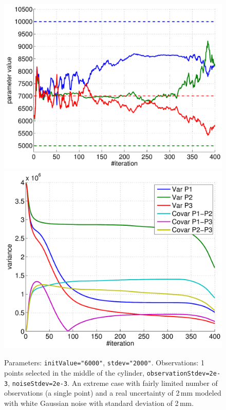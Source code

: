 \documentclass[10pt]{article}
\begin{document}
\begin{figure}[h]
\begin{center}
\includegraphics[width=.49\linewidth]{figures/p6_estim.pdf}
\hfill
\includegraphics[width=.49\linewidth]{figures/p6_var.pdf}
\caption{Parameters: \texttt{initValue="6000"}, \texttt{stdev="2000"}. Observations: 1 points selected in the middle of the cylinder,
\texttt{observationStdev=2e-3}, \texttt{noiseStdev=2e-3}. An extreme case with fairly limited number of observations (a single point) and a real uncertainty of 2\,mm modeled with white Gaussian noise with standard deviation of 2\,mm.}
\label{fig:Results1}
\end{center}
\end{figure}




\end{document}
